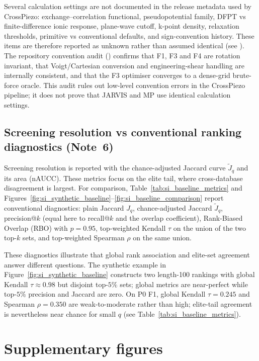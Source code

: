 \documentclass[11pt]{article}
\begin{document}
Several calculation settings are not documented in the release metadata used by CrossPiezo: exchange--correlation functional, pseudopotential family, DFPT vs finite-difference ionic response, plane-wave cutoff, k-point density, relaxation thresholds, primitive vs conventional defaults, and sign-convention history.
These items are therefore reported as unknown rather than assumed identical (see ).
The repository convention audit () confirms that F1, F3 and F4 are rotation invariant, that Voigt/Cartesian conversion and engineering-shear handling are internally consistent, and that the F3 optimiser converges to a dense-grid brute-force oracle.
This audit rules out low-level convention errors in the CrossPiezo pipeline; it does not prove that JARVIS and MP use identical calculation settings.

\subsection{Screening resolution vs conventional ranking diagnostics (Note~6)}

Screening resolution is reported with the chance-adjusted Jaccard curve $\widetilde J_q$ and its area (nAUCC). These metrics focus on the elite tail, where cross-database disagreement is largest.
For comparison, Table~\ref{tab:si_baseline_metrics} and Figures~\ref{fig:si_synthetic_baseline}--\ref{fig:si_baseline_comparison} report conventional diagnostics:
plain Jaccard $J_q$, chance-adjusted Jaccard $\widetilde J_q$, precision@$k$ (equal here to recall@$k$ and the overlap coefficient), Rank-Biased Overlap (RBO) with $p=0.95$, top-weighted Kendall $\tau$ on the union of the two top-$k$ sets, and top-weighted Spearman $\rho$ on the same union.

These diagnostics illustrate that global rank association and elite-set agreement answer different questions.
The synthetic example in Figure~\ref{fig:si_synthetic_baseline} constructs two length-100 rankings with global Kendall $\tau \approx 0.98$ but disjoint top-$5\%$ sets; global metrics are near-perfect while top-$5\%$ precision and Jaccard are zero.
On P0 F1, global Kendall $\tau=0.245$ and Spearman $\rho=0.350$ are weak-to-moderate rather than high; elite-tail agreement is nevertheless near chance for small $q$ (see Table~\ref{tab:si_baseline_metrics}).

\section{Supplementary figures}
\end{document}

